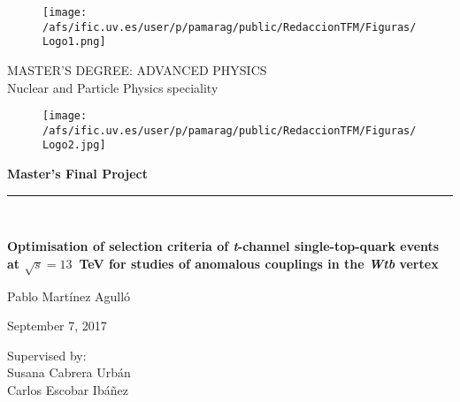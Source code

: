 \begin{titlepage}

\begin{center}
\vspace*{-1in}
\vspace*{1 cm}
\begin{figure}[htb]
\begin{center}
\texttt{[image: /afs/ific.uv.es/user/p/pamarag/public/RedaccionTFM/Figuras/Logo1.png]}
\end{center}
\end{figure}
\vspace*{2 cm}


{\large MASTER'S DEGREE: ADVANCED PHYSICS}\\
\vspace*{0.3in}
{\huge Nuclear and Particle Physics speciality}\\
\vspace*{0.9in}
\end{center}
\vspace*{-1in}
\begin{center}
\vspace*{0.5 cm}
\begin{figure}[htb]
\begin{center}
\texttt{[image: /afs/ific.uv.es/user/p/pamarag/public/RedaccionTFM/Figuras/Logo2.jpg]}
\end{center}
\end{figure}
\vspace*{1 cm}

\begin{large}
\textbf{{\LARGE Master’s Final Project}}\\
\rule{80mm}{0.1mm}\\
\vspace*{1.5 cm}

\end{large}
\vspace*{0.2in}
\begin{Large}
\textbf{Optimisation of selection criteria of \textbf{\textit{t}}-channel single-top-quark events
at \boldmath$\sqrt{s}=13$~TeV for studies of anomalous couplings in the \textbf{\textit{Wtb}} vertex} \\
\end{Large}
\vspace*{0.3in}
\vspace*{1cm}

\begin{large}
Pablo Martínez Agulló\\
\end{large}
September 7, 2017
\end{center}
\vspace*{0.3in}
\vspace*{0.1in}
\begin{large}
\begin{flushright}
Supervised by: \\
Susana Cabrera Urbán \\
Carlos Escobar Ibáñez
\end{flushright}
\end{large}


\end{titlepage}